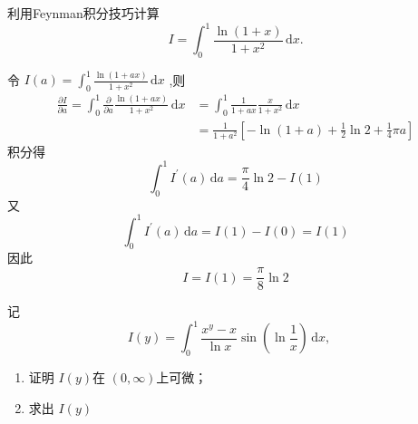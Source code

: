 \documentclass[lang=cn,12pt,color=green,fontset=none,thmcnt=section]{elegantbook}
\begin{document}
\begin{exercise}
    利用Feynman积分技巧计算 $$
    I = \int_{0}^{1} \frac{\ln \left( 1+ x \right)  }{ 1+ x^{2}} \,\mathrm{d} x. 
    $$
\end{exercise}
\begin{solution}
    令 $ I\left( a \right) = \int_{0}^{1} \frac{\ln \left( 1+ ax \right)   }{1+ x^{2} }  \,\mathrm{d} x $ ,则 $$
    \begin{aligned}
        \frac{\partial I}{\partial a} = \int_{0}^{1} \frac{\partial }{\partial a} \frac{\ln \left( 1+ ax \right)  }{1+ x^{2} }\,\mathrm{d} x&=  \int_{0}^{1} \frac{1}{1+ ax}  \frac{x}{1+ x^{2}} \,\mathrm{d} x \\ 
         & = \frac{1}{1+ a^{2}} \left[ -\ln \left( 1+ a \right) +  \frac{1}{2}\ln 2+  \frac{1}{4}\pi a  \right] 
    \end{aligned}
    $$积分得 $$
    \int_{0}^{1} I^{\prime} \left( a \right)\,\mathrm{d} a = \frac{\pi   }{4 } \ln 2-I\left( 1 \right) 
    $$又 $$
    \int_{0}^{1}I^{\prime} \left( a \right)\,\mathrm{d} a = I\left( 1 \right)-I \left( 0 \right)    = I\left( 1 \right) 
    $$因此 $$
    I = I\left( 1 \right) = \frac{\pi    }{8 } \ln 2  
    $$
\end{solution}

\begin{exercise}
    记 $$
    I\left( y \right) = \int_{0}^{1} \frac{x^{y}-x }{\ln x } \sin \left(  \ln  \frac{1}{x} \right) \,\mathrm{d} x,\quad    
    $$

    \begin{enumerate}
        \item 证明 $ I\left( y \right)  $在 $ \left( 0,\infty \right)  $上可微；
        \item 求出 $ I\left( y \right)  $   
    \end{enumerate}

\end{exercise}
\end{document}
